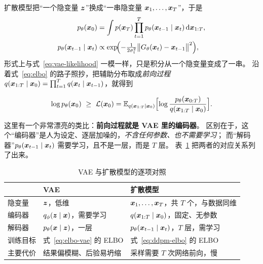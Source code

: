 扩散模型把“一个隐变量 $\bm{z}$”换成“一串隐变量 $\bm{x}_1,\dots,\bm{x}_T$”，于是
\begin{equation}
  \begin{aligned}
    p_\theta(\bm{x}_0)
    &=\int p(\bm{x}_T)\prod_{t=1}^{T}p_\theta(\bm{x}_{t-1}\mid\bm{x}_t)\,\mathrm{d}\bm{x}_{1:T}, \\
    p_\theta(\bm{x}_{t-1}\mid\bm{x}_t)
    &\propto\exp\!\Bigl(-\tfrac{1}{2\sigma_t^2}
      \bigl\|G_\theta(\bm{x}_t)-\bm{x}_{t-1}\bigr\|^2\Bigr),
  \end{aligned}
  \label{eq:ddpm-likelihood}
\end{equation}
形式上与式~\eqref{eq:vae-likelihood} 一模一样，只是积分从一个隐变量变成了一串。
沿着式~\eqref{eq:elbo} 的路子照抄，把辅助分布取成\emph{前向过程}
$q(\bm{x}_{1:T}\mid\bm{x}_0)=\prod_{t=1}^{T}q(\bm{x}_t\mid\bm{x}_{t-1})$，就得到

\begin{equation}
  \log p_\theta(\bm{x}_0)\ \ge\
  \mathcal{L}(\bm{x}_0)=\mathbb{E}_{q(\bm{x}_{1:T}\mid\bm{x}_0)}
  \Bigl[\log\frac{p_\theta(\bm{x}_{0:T})}{q(\bm{x}_{1:T}\mid\bm{x}_0)}\Bigr].
  \label{eq:ddpm-elbo}
\end{equation}

这里有一个非常漂亮的类比\cite{lee-ddpm}：\textbf{前向过程就是 VAE 里的编码器}。
区别在于，这个“编码器”是人为设定、逐层加噪的，\emph{不含任何参数、也不需要学习}；
而“解码器”$p_\theta(\bm{x}_{t-1}\mid\bm{x}_t)$ 需要学习，且不是一层，而是 $T$ 层。
表~\ref{tab:vae-vs-diff} 把两者的对应关系列了出来。

\begin{table}[htbp]
  \centering
  \caption{VAE 与扩散模型的逐项对照}
  \label{tab:vae-vs-diff}
  \small
  \renewcommand{\arraystretch}{1.35}
  \setlength{\tabcolsep}{6pt}
  \begin{tabular}{@{}l p{4.6cm} p{5.6cm}@{}}
    \toprule
     & VAE & 扩散模型 \\
    \midrule
    隐变量       & $\bm{z}$，低维           & $\bm{x}_1,\dots,\bm{x}_T$，共 $T$ 个，与数据同维 \\
    编码器       & $q_\phi(\bm{z}\mid\bm{x})$，需要学习 & $q(\bm{x}_{1:T}\mid\bm{x}_0)$，固定、无参数 \\
    解码器       & $p_\theta(\bm{x}\mid\bm{z})$，一层     & $p_\theta(\bm{x}_{t-1}\mid\bm{x}_t)$，$T$ 层，需学习 \\
    训练目标     & 式~\eqref{eq:elbo-vae} 的 ELBO & 式~\eqref{eq:ddpm-elbo} 的 ELBO \\
    主要代价     & 结果偏模糊、后验易坍缩 & 采样需要 $T$ 次网络前向，慢 \\
    \bottomrule
  \end{tabular}
\end{table}

